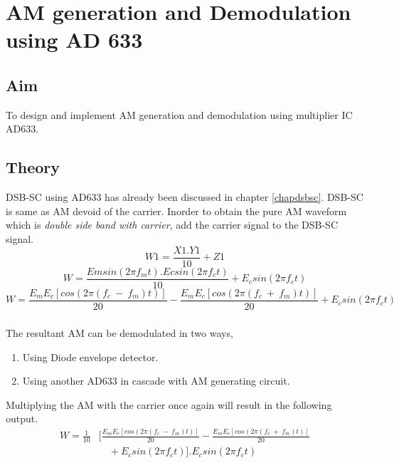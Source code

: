 
\chapter[AM generation and Demodulation using AD 633]{AM generation and Demodulation using AD 633}
\section*{Aim}
To design and implement AM generation and demodulation using multiplier IC AD633.
\section*{Theory}
DSB-SC using AD633 has already been discussed in chapter \ref{chapdsbsc}. DSB-SC is same as AM devoid of the carrier. Inorder to obtain the pure AM waveform which is \emph{double side band with carrier}, add the carrier signal to the DSB-SC signal.
\begin{equation}
W1= \frac{X1.Y1}{10}+Z1
\end{equation}
\begin{equation}
W= \frac{Emsin(2\pi f_mt).Ecsin(2\pi f_ct)}{10}+E_c sin(2\pi f_ct)
\end{equation}
\begin{equation}
W= \frac{E_mE_c [cos (2\pi (f_c\ -\ f_m)t)]}{20}- \frac{E_mE_c[cos (2\pi (f_c\ +\ f_m)t)]}{20}+E_c sin(2\pi f_ct)
\end{equation}

\paragraph{}
	The resultant AM can be demodulated in two ways,
 \begin{enumerate}

\item
Using Diode envelope detector.
\item
Using another AD633 in cascade with AM generating circuit.
\end{enumerate}

Multiplying the AM with the carrier once again will result in the following output.
\begin{equation}
\begin{split}
W=\frac{1}{10} &[ \frac{E_mE_c [cos (2\pi (f_c\ -\ f_m)t)]}{20}- \frac{E_mE_c[cos (2\pi (f_c\ +\ f_m)t)]}{20}\\
&\quad +E_c sin(2\pi f_ct)].E_c sin(2\pi f_ct)
\end{split}
\end{equation}

